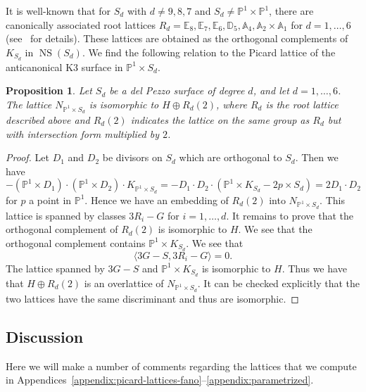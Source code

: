 \documentclass[10pt]{amsart}
\numberwithin{equation}{section}
\theoremstyle{plain}
\newtheorem{proposition}[theorem]{Proposition}
\theoremstyle{definition}
\theoremstyle{remark}
\DeclareMathOperator{\NS}{NS}
\begin{document}
It is well-known that for \(S_d\) with \(d \neq 9,8,7\) and \(S_d \neq \mathbb{P}^1 \times \mathbb{P}^1\), there are canonically associated root lattices \(R_d=\mathbb{E}_8,\mathbb{E}_7,\mathbb{E}_6,\mathbb{D}_5,\mathbb{A}_4,\mathbb{A}_2 \times \mathbb{A}_1\) for \(d = 1, \ldots, 6\) (see~\cite[Chapter~8]{dolgachev2012classical} for details). These lattices are obtained as the orthogonal complements of \(K_{S_d}\) in \(\NS(S_d)\). We find the following relation to the Picard lattice of the anticanonical K3 surface in \(\mathbb{P}^1\times S_d\).

\begin{proposition}\label{proposition:dppic}
  Let \(S_d\) be a del Pezzo surface of degree \(d\), and let \(d = 1, \ldots, 6\). The lattice \(N_{\mathbb{P}^1\times S_d}\) is isomorphic to \(H \oplus R_d(2)\), where \(R_d\) is the root lattice described above and \(R_d(2)\) indicates the lattice on the same group as \(R_d\) but with intersection form multiplied by \(2\).
\end{proposition}

\begin{proof}
  Let \(D_1\) and \(D_2\) be divisors on \(S_d\) which are orthogonal to \(S_d\). Then we have
  \[
    -(\mathbb{P}^1 \times D_1)\cdot(\mathbb{P}^1\times D_2)\cdot K_{\mathbb{P}^1\times S_d} = -D_1\cdot D_2\cdot(\mathbb{P}^1 \times K_{S_d}  - 2p \times S_d) = 2D_1\cdot D_2
  \]
  for \(p\) a point in \(\mathbb{P}^1\). Hence we have an embedding of \(R_d(2)\) into \(N_{\mathbb{P}^1\times S_d}\). This lattice is spanned by classes \(3R_i - G\) for \(i=1, \ldots, d\). It remains to prove that the orthogonal complement of \(R_d(2)\) is isomorphic to \(H\). We see that the orthogonal complement contains \(\mathbb{P}^1 \times K_{S_d}\). We see that
  \[
    \langle 3G-S , 3R_i - G \rangle = 0.
  \]
  The lattice spanned by \(3G-S\) and \(\mathbb{P}^1 \times K_{S_d}\) is isomorphic to \(H\). Thus we have that \(H \oplus R_d(2)\) is an overlattice of \(N_{\mathbb{P}^1\times S_d}\). It can be checked explicitly that the two lattices have the same discriminant and thus are isomorphic.
\end{proof}

\subsection{Discussion} Here we will make a number of comments regarding the lattices that we compute in Appendices~\ref{appendix:picard-lattices-fano}--\ref{appendix:parametrized}.
\end{document}
